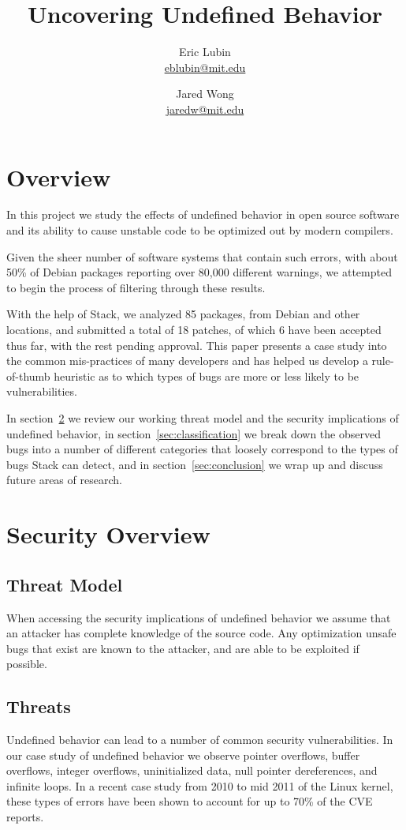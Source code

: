 \documentclass[10pt,twocolumn]{article}
\title{Uncovering Undefined Behavior}
\author{
    Eric Lubin\\
    \href{mailto:eblubin@mit.edu}{eblubin@mit.edu}
\and
    Jared Wong\\
    \href{mailto:jaredw@mit.edu}{jaredw@mit.edu}
}
\newcommand{\NumPackages}{85 }
\newcommand{\NumPatches}{18 }
\newcommand{\NumPatchesAccepted}{6 }
\begin{document}
\maketitle

\section{Overview}
In this project we study the effects of undefined behavior in open source software
and its ability to cause unstable code to be optimized out by modern compilers.

Given the sheer number of software systems that contain such errors, 
with about 50\% of Debian packages reporting over 80,000 different warnings,
we attempted to begin the process of filtering through these results. 

With the help of Stack\cite{stack}, we analyzed \NumPackages packages, from
Debian and other locations, and submitted a total of \NumPatches patches, of
which \NumPatchesAccepted have been accepted thus far, with the rest pending
approval. This paper presents a case study into the common mis-practices of
many developers and has helped us develop a rule-of-thumb heuristic as to which
types of bugs are more or less likely to be vulnerabilities.

In section~\ref{sec:security} we review our working threat model and the
security implications of undefined behavior, in
section~\ref{sec:classification} we break down the observed bugs into a number
of different categories that loosely correspond to the types of bugs Stack
can detect, and in section~\ref{sec:conclusion} we wrap up and discuss future
areas of research.

\section{Security Overview}
\label{sec:security}
\subsection{Threat Model}
When accessing the security implications of undefined behavior we assume that
an attacker has complete knowledge of the source code. Any optimization unsafe
bugs that exist are known to the attacker, and are able to be exploited if
possible.

\subsection{Threats}
Undefined behavior can lead to a number of common security vulnerabilities. In
our case study of undefined behavior we observe pointer overflows, buffer
overflows, integer overflows, uninitialized data, null pointer dereferences,
and infinite loops. In a recent case study from 2010 to mid 2011
\cite{chen-kbugs} of the Linux kernel, these types of errors have been shown to
account for up to 70\% of the CVE reports.
\end{document}
